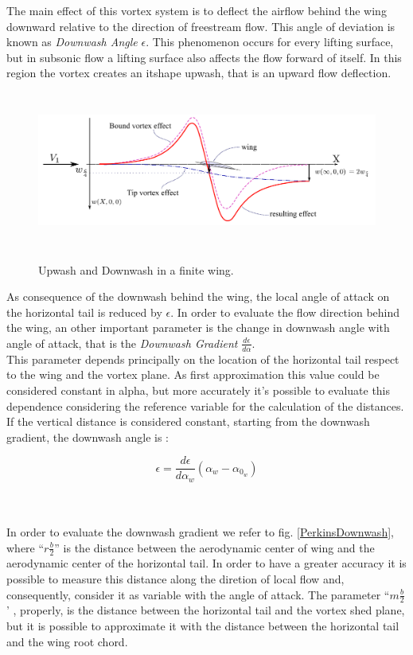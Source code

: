 The main effect of this vortex system is to deflect the airflow behind the wing downward relative to the direction of freestream flow. This angle of deviation is known as {\itshape Downwash Angle} $\epsilon$. This phenomenon occurs for every lifting surface, but in subsonic flow a lifting surface also affects the flow forward of itself. In this region the vortex creates an {itshape upwash}, that is an upward flow deflection.\\


\begin{figure}[H]
\centering
{\includegraphics[height=5.16cm]{Immagini/wing_upwash_downwash.pdf}} 
\caption{Upwash and Downwash in a finite wing.}
\end{figure}

As consequence of the downwash behind the wing, the local angle of attack on the horizontal tail is reduced by  $\epsilon$. In order to evaluate the flow direction behind the wing, an other important parameter is the change in downwash angle with angle of attack, that is the {\itshape Downwash Gradient } $\frac{d\epsilon}{d\alpha}$.\\
This parameter depends principally on the location of the horizontal tail respect to the wing and the vortex plane. As first approximation this value could be considered constant in alpha, but more accurately it's possible to evaluate this dependence considering the reference variable for the calculation of the distances. 
If the vertical distance is considered constant, starting from the downwash gradient, the downwash angle is :

\begin{equation}
\epsilon = \frac {d \epsilon}{d \alpha_w} (\alpha_w - \alpha_{0_w})
\end{equation}

\noindent \\ \\
In order to evaluate the downwash gradient we refer to fig. \ref{PerkinsDownwash}, where ``$r \frac{b}{2}$''  is the distance between the aerodynamic center of wing and the aerodynamic center of the horizontal tail. In order to have a greater accuracy it is possible to measure this distance along the diretion of local flow and, consequently, consider it as variable with the angle of attack. The parameter ``$m\frac{b}{2}$' , properly, is the distance between the horizontal tail and the vortex shed plane, but it is possible to approximate it with the distance between the horizontal tail and the wing root chord.\cite{schimidth}

